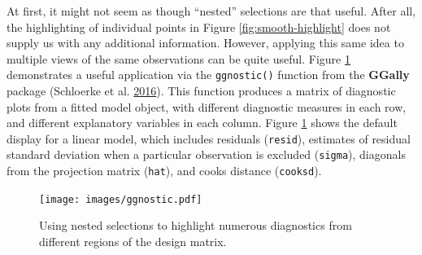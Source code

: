 \documentclass[12pt,]{isuthesis}
\newenvironment{Shaded}{\begin{snugshade}}{\end{snugshade}}
\newcommand{\KeywordTok}[1]{\textcolor[rgb]{0.13,0.29,0.53}{\textbf{{#1}}}}
\newcommand{\DataTypeTok}[1]{\textcolor[rgb]{0.13,0.29,0.53}{{#1}}}
\newcommand{\StringTok}[1]{\textcolor[rgb]{0.31,0.60,0.02}{{#1}}}
\newcommand{\CommentTok}[1]{\textcolor[rgb]{0.56,0.35,0.01}{\textit{{#1}}}}
\newcommand{\OtherTok}[1]{\textcolor[rgb]{0.56,0.35,0.01}{{#1}}}
\newcommand{\NormalTok}[1]{{#1}}
\begin{document}
At first, it might not seem as though ``nested'' selections are that
useful. After all, the highlighting of individual points in Figure
\ref{fig:smooth-highlight} does not supply us with any additional
information. However, applying this same idea to multiple views of the
same observations can be quite useful. Figure \ref{fig:ggnostic}
demonstrates a useful application via the \texttt{ggnostic()} function
from the \textbf{GGally} package (Schloerke et al.
\protect\hyperlink{ref-GGally}{2016}). This function produces a matrix
of diagnostic plots from a fitted model object, with different
diagnostic measures in each row, and different explanatory variables in
each column. Figure \ref{fig:ggnostic} shows the default display for a
linear model, which includes residuals (\texttt{resid}), estimates of
residual standard deviation when a particular observation is excluded
(\texttt{sigma}), diagonals from the projection matrix (\texttt{hat}),
and cooks distance (\texttt{cooksd}).

\begin{Shaded}
\end{Shaded}

\begin{figure}
\centering
\texttt{[image: images/ggnostic.pdf]}
\caption{\label{fig:ggnostic}Using nested selections to highlight numerous
diagnostics from different regions of the design matrix.}
\end{figure}
\end{document}
